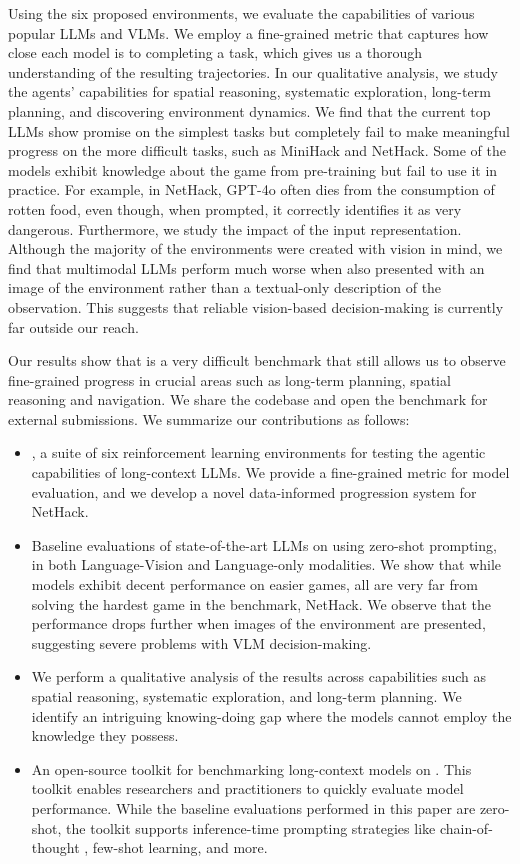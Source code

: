 Using the six proposed environments, we evaluate the capabilities of various popular LLMs and VLMs.  We employ a fine-grained metric that captures how close each model is to completing a task, which gives us a thorough understanding of the resulting trajectories. In our qualitative analysis, we study the agents' capabilities for spatial reasoning, systematic exploration, long-term planning, and discovering environment dynamics. We find that the current top LLMs show promise on the simplest tasks but completely fail to make meaningful progress on the more difficult tasks, such as MiniHack and NetHack. Some of the models exhibit knowledge about the game from pre-training but fail to use it in practice. For example, in NetHack, GPT-4o often dies from the consumption of rotten food, even though, when prompted, it correctly identifies it as very dangerous. Furthermore, we study the impact of the input representation. Although the majority of the environments were created with vision in mind, we find that multimodal LLMs perform much worse when also presented with an image of the environment rather than a textual-only description of the observation. This suggests that reliable vision-based decision-making is currently far outside our reach.

Our results show that \our{} is a very difficult benchmark that still allows us to observe fine-grained progress in crucial areas such as long-term planning, spatial reasoning and navigation. We share the codebase and open the benchmark for external submissions.
We summarize our contributions as follows:

\begin{itemize}
    \item \our{}, a suite of six reinforcement learning environments for testing the agentic capabilities of long-context LLMs. We provide a fine-grained metric for model evaluation, and we develop a novel data-informed progression system for NetHack.
    \item Baseline evaluations of state-of-the-art LLMs on \our{} using zero-shot prompting, in both Language-Vision and Language-only modalities. We show that while models exhibit decent performance on easier games, all are very far from solving the hardest game in the benchmark, NetHack. We observe that the performance drops further when images of the environment are presented, suggesting severe problems with VLM decision-making. 
    \item We perform a qualitative analysis of the results across capabilities such as spatial reasoning, systematic exploration, and long-term planning. We identify an intriguing knowing-doing gap where the models cannot employ the knowledge they possess.
     \item An open-source toolkit for benchmarking long-context models on \our{}. This toolkit enables researchers and practitioners to quickly evaluate model performance. While the baseline evaluations performed in this paper are zero-shot, the \our{} toolkit supports inference-time prompting strategies like chain-of-thought \citep{wei2022chain}, few-shot learning, and more.
\end{itemize}
\vspace{-2mm}



